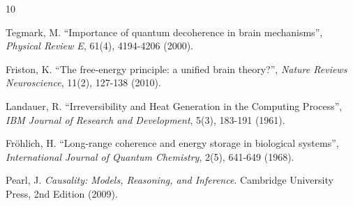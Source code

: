 \documentclass[10pt,twocolumn,letterpaper]{article}
\begin{document}
\begin{thebibliography}{10}

Tegmark, M. ``Importance of quantum decoherence in brain mechanisms'', \textit{Physical Review E}, 61(4), 4194-4206 (2000).

Friston, K. ``The free-energy principle: a unified brain theory?'', \textit{Nature Reviews Neuroscience}, 11(2), 127-138 (2010).

Landauer, R. ``Irreversibility and Heat Generation in the Computing Process'', \textit{IBM Journal of Research and Development}, 5(3), 183-191 (1961).

Fr\"ohlich, H. ``Long-range coherence and energy storage in biological systems'', \textit{International Journal of Quantum Chemistry}, 2(5), 641-649 (1968).

Pearl, J. \textit{Causality: Models, Reasoning, and Inference}. Cambridge University Press, 2nd Edition (2009).

\end{thebibliography}
\end{document}
